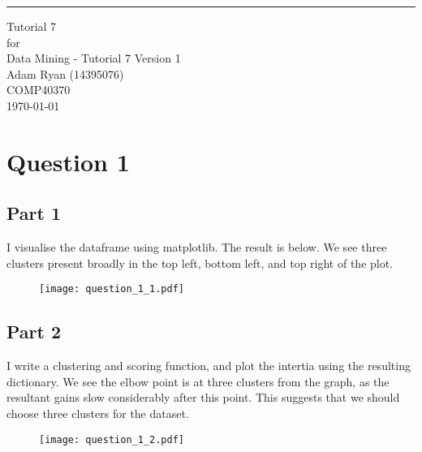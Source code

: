 \documentclass{scrreprt}
\date{}
\def\myversion{1 }
\begin{document}
	
	\begin{flushright}
		\rule{16cm}{5pt}\vskip1cm
		\begin{bfseries}
			\Huge{Tutorial 7\\}
			\vspace{1.9cm}
			for\\
			\vspace{1.9cm}
			Data Mining - Tutorial 7
			\vspace{1.9cm}
			\LARGE{Version \myversion}\\
			\vspace{1.9cm}
			Adam Ryan (14395076)\\
			\vspace{1.9cm}
			COMP40370\\
			\vspace{1.9cm}
			\today\\
		\end{bfseries}
	\end{flushright}
	
	\tableofcontents

	
\chapter{Question 1}

\section{Part 1}\label{E1Q1}
I visualise the dataframe using matplotlib. The result is below. We see three clusters present broadly in the top left, bottom left, and top right of the plot.

\begin{figure}[h!]
	\centering
	\texttt{[image: question\_1\_1.pdf]}
\end{figure}

\section{Part 2}\label{E1Q2}
I write a clustering and scoring function, and plot the intertia using the resulting dictionary. We see the elbow point is at three clusters from the graph, as the resultant gains slow considerably after this point. This suggests that we should choose three clusters for the dataset.
\begin{figure}[h!]
	\centering
	\texttt{[image: question\_1\_2.pdf]}
\end{figure}
\end{document}
